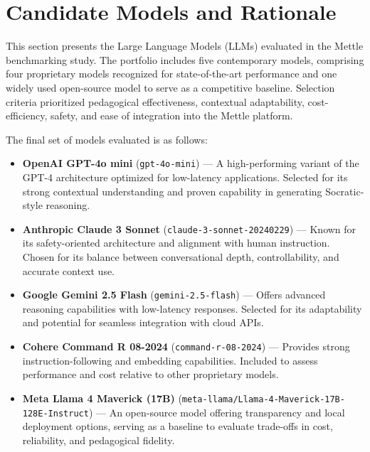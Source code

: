 \section{Candidate Models and Rationale}
\label{sec:candidate_models}

This section presents the Large Language Models (LLMs) evaluated in the Mettle benchmarking study. The portfolio includes five contemporary models, comprising four proprietary models recognized for state-of-the-art performance and one widely used open-source model to serve as a competitive baseline. Selection criteria prioritized pedagogical effectiveness, contextual adaptability, cost-efficiency, safety, and ease of integration into the Mettle platform.

The final set of models evaluated is as follows:

\begin{itemize}
    \item \textbf{OpenAI GPT-4o mini} (\texttt{gpt-4o-mini}) — A high-performing variant of the GPT-4 architecture optimized for low-latency applications. Selected for its strong contextual understanding and proven capability in generating Socratic-style reasoning.
    
    \item \textbf{Anthropic Claude 3 Sonnet} (\texttt{claude-3-sonnet-20240229}) — Known for its safety-oriented architecture and alignment with human instruction. Chosen for its balance between conversational depth, controllability, and accurate context use.
    
    \item \textbf{Google Gemini 2.5 Flash} (\texttt{gemini-2.5-flash}) — Offers advanced reasoning capabilities with low-latency responses. Selected for its adaptability and potential for seamless integration with cloud APIs.
    
    \item \textbf{Cohere Command R 08-2024} (\texttt{command-r-08-2024}) — Provides strong instruction-following and embedding capabilities. Included to assess performance and cost relative to other proprietary models.
    
    \item \textbf{Meta Llama 4 Maverick (17B)} (\texttt{meta-llama/Llama-4-Maverick-17B-128E-Instruct}) — An open-source model offering transparency and local deployment options, serving as a baseline to evaluate trade-offs in cost, reliability, and pedagogical fidelity.
\end{itemize}

